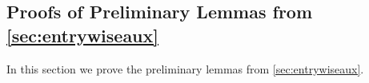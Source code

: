 \documentclass[10pt]{article}
\newcommand{\0}{{\mathbf{0}}}
\newcommand{\1}{{\mathbf{1}}}
\newtheorem{theorem}{Theorem}
\newcommand{\p}{\mathbb{P}}
\renewcommand{\hat}{\widehat}
\renewcommand{\hat}{\widehat}
\begin{document}


\subsection{Proofs of Preliminary Lemmas from \cref{sec:entrywiseaux}} \label{sec:entrywiseauxproofs}
In this section we prove the preliminary lemmas from \cref{sec:entrywiseaux}. 
\end{document}
